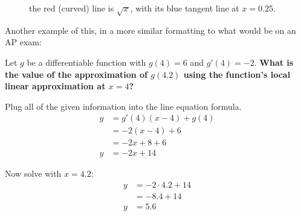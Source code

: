 \documentclass[12pt]{article}
\begin{document}
\begin{figure}[h]
	\begin{center}
		\caption{the red (curved) line is $\sqrt{x}$, with its blue tangent line at $x=0.25$.}
		\label{fig:locallinapprox}
	\end{center}
\end{figure}

Another example of this, in a more similar formatting to what would be on an AP exam:

\noindent Let $g$ be a differentiable function with $g(4) = 6$ and $g'(4) = -2$. \textbf{What is the value of the approximation of $g(4.2)$ using the function's local linear approximation at $x=4$?}

\begin{center}
	Plug all of the given information into the line equation formula.
	\begin{align*}
		y & = g'(4)(x-4) + g(4) \\
		& = -2(x-4) + 6       \\
		& = -2x + 8 + 6       \\
		y & = -2x + 14
	\end{align*}

	Now solve with $x=4.2$:
	\begin{align*}
		y & = -2 \cdot 4.2 + 14 \\
		& = -8.4 + 14         \\
		y & = 5.6
	\end{align*}
\end{center}
\end{document}
